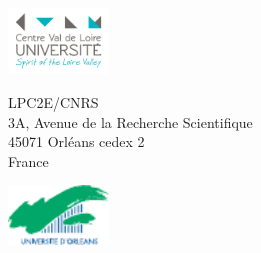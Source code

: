 {%
\includegraphics[width=0.2\textwidth, valign=c]{./images/logos/pucvl}
\hfill
\begin{minipage}{.5\textwidth}
\begin{center}
LPC2E/CNRS\\
3A, Avenue de la Recherche Scientifique\\
45071 Orléans cedex 2\\
France \\
\end{center}
\end{minipage}
\hfill
\includegraphics[width=0.2\textwidth, valign=c]{./images/logos/univ}

}